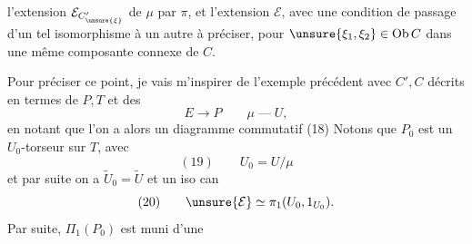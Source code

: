 l'extension $\mathcal E_{C'_{\unsure{\xi}}}$ de $\mu$ par $\pi$, et l'extension
$\mathcal E$, avec une condition de passage d'un
tel isomorphisme à un autre à préciser,
pour $\unsure{\xi_1,\xi_2}\in\operatorname{Ob}C$ dans une même composante
connexe de $C$.

Pour préciser ce point, je vais m'inspirer
de l'exemple précédent avec $C',C$
décrits en termes de $P,T$ et des
\[
E\longrightarrow P
\qquad
\mu\mathbin{\text{---}}U,
\]
en notant que l'on a alors un diagramme
commutatif
\quad(18)
Notons que  $P_0$ est un $U_0$-torseur sur $T$,
avec
\[
(19)\qquad U_0=U/\mu
\]
et par suite on a $\widetilde U_0=\widetilde U$ et un iso can
\[
(20)\qquad \unsure{\mathcal E}\simeq\pi_1(U_0,1_{U_0}).
\]
Par suite,  $\Pi_1(P_0)$ est muni d'une
